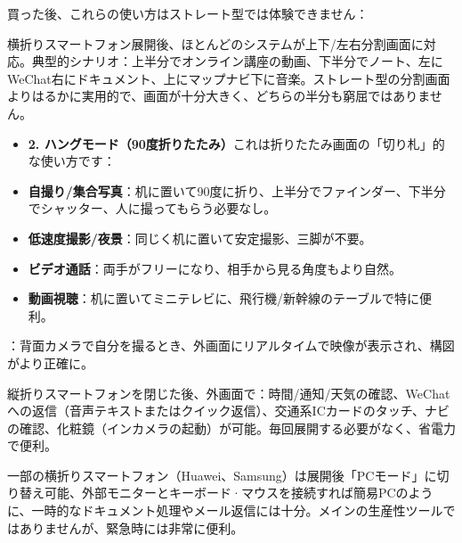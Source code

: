 
買った後、これらの使い方はストレート型では体験できません：


横折りスマートフォン展開後、ほとんどのシステムが上下/左右分割画面に対応。典型的シナリオ：上半分でオンライン講座の動画、下半分でノート、左にWeChat右にドキュメント、上にマップナビ下に音楽。ストレート型の分割画面よりはるかに実用的で、画面が十分大きく、どちらの半分も窮屈ではありません。

\begin{itemize}
  \item \textbf{2. ハングモード（90度折りたたみ）}これは折りたたみ画面の「切り札」的な使い方です：
  \item \textbf{自撮り/集合写真}：机に置いて90度に折り、上半分でファインダー、下半分でシャッター、人に撮ってもらう必要なし。
  \item \textbf{低速度撮影/夜景}：同じく机に置いて安定撮影、三脚が不要。
  \item \textbf{ビデオ通話}：両手がフリーになり、相手から見る角度もより自然。
  \item \textbf{動画視聴}：机に置いてミニテレビに、飛行機/新幹線のテーブルで特に便利。
\end{itemize}


：背面カメラで自分を撮るとき、外画面にリアルタイムで映像が表示され、構図がより正確に。


縦折りスマートフォンを閉じた後、外画面で：時間/通知/天気の確認、WeChatへの返信（音声テキストまたはクイック返信）、交通系ICカードのタッチ、ナビの確認、化粧鏡（インカメラの起動）が可能。毎回展開する必要がなく、省電力で便利。


一部の横折りスマートフォン（Huawei、Samsung）は展開後「PCモード」に切り替え可能、外部モニターとキーボード·マウスを接続すれば簡易PCのように、一時的なドキュメント処理やメール返信には十分。メインの生産性ツールではありませんが、緊急時には非常に便利。

